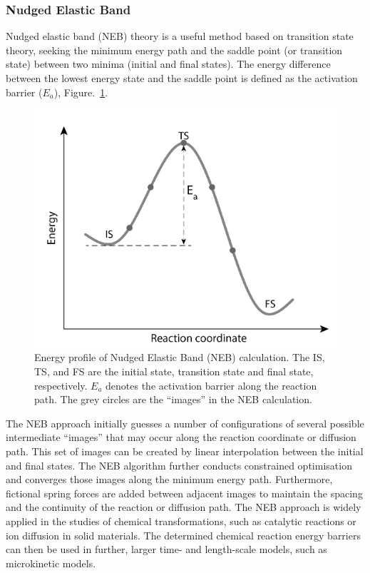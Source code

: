 \documentclass[../main.tex]{subfiles}
\begin{document}
\subsubsection{Nudged Elastic Band} 
\label{sec:methods_neb}
Nudged elastic band (NEB) theory is a useful method based on transition state theory, seeking the minimum energy path and the saddle point (or transition state) between two minima (initial and final states).\cite{JONSSON1998,henkelman2000climbing,henkelman2000improved} The energy difference between the lowest energy state and the saddle point is defined as the activation barrier ($E_a$), Figure.~\ref{fig:NEB_profile}. \cite{henkelman2000improved}

\begin{figure}
    \centering
    \includegraphics[scale=0.6]{figures/NEB_profile.png}
    \caption{Energy profile of Nudged Elastic Band (NEB) calculation. The IS, TS, and FS are the initial state, transition state and final state, respectively. $E_a$ denotes the activation barrier along the reaction path. The grey circles are the ``images'' in the NEB calculation.}
    \label{fig:NEB_profile}
\end{figure}

The NEB approach initially guesses a number of configurations of several possible intermediate ``images'' that may occur along the reaction coordinate or diffusion path. This set of images can be created by linear interpolation between the initial and final states. The NEB algorithm further conducts constrained optimisation and converges those images along the minimum energy path. Furthermore, fictional spring forces are added between adjacent images to maintain the spacing and the continuity of the reaction or diffusion path. The NEB approach is widely applied in the studies of chemical transformations, such as catalytic reactions or ion diffusion in solid materials. The determined chemical reaction energy barriers can then be used in further, larger time- and length-scale models, such as microkinetic models.\cite{peng2020lithium,Mercer2021}
\end{document}
